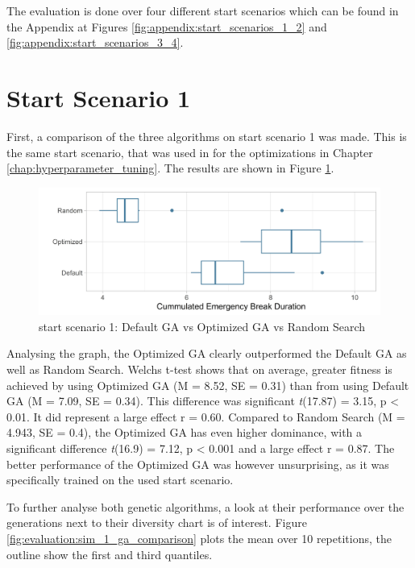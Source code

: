 The evaluation is done over four different start scenarios which can be found in the Appendix at Figures \ref{fig:appendix:start_scenarios_1_2} and \ref{fig:appendix:start_scenarios_3_4}.

\section{Start Scenario 1}
First, a comparison of the three algorithms on start scenario 1 was made. This is the same start scenario, that was used in for the optimizations in Chapter \ref{chap:hyperparameter_tuning}. The results are shown in Figure \ref{fig:evaluation:sim_1_comparison}.

\begin{figure}[ht] 
	\includegraphics[width=1\linewidth]{simulations/evaluation/plots/sim_1_comparison}
	\caption{start scenario 1: Default GA vs Optimized GA vs Random Search}
	\label{fig:evaluation:sim_1_comparison}
\end{figure}

Analysing the graph, the Optimized GA clearly outperformed the Default GA as well as Random Search. Welchs t-test shows that on average, greater fitness is achieved by using Optimized GA (M = 8.52, SE = 0.31) than from using Default GA (M = 7.09, SE = 0.34). This difference was significant \textit{t}(17.87) = 3.15, p < 0.01. It did represent a large effect r = 0.60.
Compared to Random Search (M = 4.943, SE = 0.4), the Optimized GA has even higher dominance, with a significant difference \textit{t}(16.9) = 7.12, p < 0.001 and a large effect r = 0.87. The better performance of the Optimized GA was however unsurprising, as it was specifically trained on the used start scenario.

To further analyse both genetic algorithms, a look at their performance over the generations next to their diversity chart is of interest. Figure \ref{fig:evaluation:sim_1_ga_comparison} plots the mean over 10 repetitions, the outline show the first and third quantiles.

